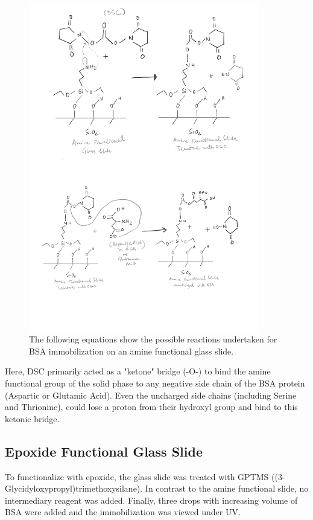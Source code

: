 \documentclass[pdflatex,sn-mathphys]{sn-jnl}%
\theoremstyle{thmstyleone}%
\theoremstyle{thmstyletwo}%
\theoremstyle{thmstylethree}%
\begin{document}
\begin{figure}[h]%
\centering
\includegraphics[width=0.9\textwidth]{photos/amine_functional.jpg}
\caption{The following equations show the possible reactions undertaken for BSA immobilization on an amine functional glass slide. }\label{fig1}
\end{figure}
Here, DSC primarily acted as a "ketone" bridge (-O-) to bind the amine functional group of the solid phase to any negative side chain of the BSA protein (Aspartic or Glutamic Acid). Even the uncharged side chains (including Serine and Thrionine), could lose a proton from their hydroxyl group and bind to this ketonic bridge.

\subsection{Epoxide Functional Glass Slide}\label{subsec2}
To functionalize with epoxide, the glass slide was treated with GPTMS ((3-Glycidyloxypropyl)trimethoxysilane). In contrast to the amine functional slide, no intermediary reagent was added. Finally, three drops with increasing volume of BSA were added and the immobilization was viewed under UV. 
\end{document}
